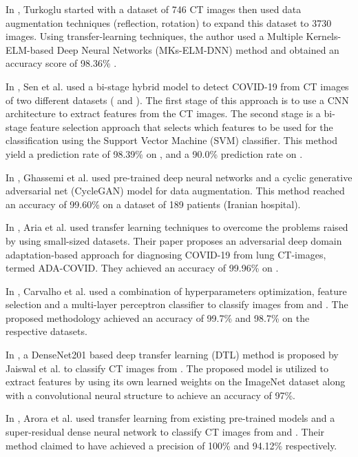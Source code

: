 \documentclass[12pt, letterpaper]{article}
\begin{document}
In \cite{Turkoglu_2021}, Turkoglu started with a dataset of 746 CT images then used data augmentation techniques (reflection, rotation) to expand this dataset to 3730 images. Using transfer-learning techniques, the author used a Multiple Kernels-ELM-based Deep Neural Networks (MKs-ELM-DNN) method and obtained an accuracy score of 98.36\% \cite{Turkoglu_2021}.

In \cite{Sen_2021}, Sen et al. used a bi-stage hybrid model to detect COVID-19 from CT images of two different datasets (\cite{Angelov_2020} and \cite{Zhao_2020}). The first stage of this approach is to use a CNN architecture to extract features from the CT images. The second stage is a bi-stage feature selection approach that selects which features to be used for the classification using the Support Vector Machine (SVM) classifier. This method yield a prediction rate of 98.39\% on \cite{Angelov_2020}, and a 90.0\% prediction rate on \cite{Zhao_2020}.

In \cite{Ghassemi_2021}, Ghassemi et al. used pre-trained deep neural networks and a cyclic generative adversarial net (CycleGAN) model for data augmentation. This method reached an accuracy of 99.60\% on a dataset of 189 patients (Iranian hospital). 

In \cite{Aria_2022}, Aria et al. used transfer learning techniques to overcome the problems raised by using small-sized datasets. Their paper proposes an adversarial deep domain adaptation-based approach for diagnosing COVID-19 from lung CT-images, termed ADA-COVID. They achieved an accuracy of 99.96\% on \cite{Angelov_2020}. 

In \cite{Carvalho_2021}, Carvalho et al. used a combination of hyperparameters optimization, feature selection and a multi-layer perceptron classifier to classify images from \cite{Angelov_2020} and \cite{Zhao_2020}. The proposed methodology achieved an accuracy of 99.7\% and 98.7\% on the respective datasets.

In \cite{Jaiswal_2020}, a DenseNet201 based deep transfer learning (DTL) method is proposed by Jaiswal et al. to classify CT images from \cite{Angelov_2020}. The proposed model is utilized to extract features by using its own learned weights on the ImageNet dataset along with a convolutional neural structure to achieve an accuracy of 97\%.

In \cite{Arora_2021}, Arora et al. used transfer learning from existing pre-trained models and a super-residual dense neural network to classify CT images from \cite{Angelov_2020} and \cite{Zhao_2020}. Their method claimed to have achieved a precision of 100\% and 94.12\% respectively.
\end{document}
